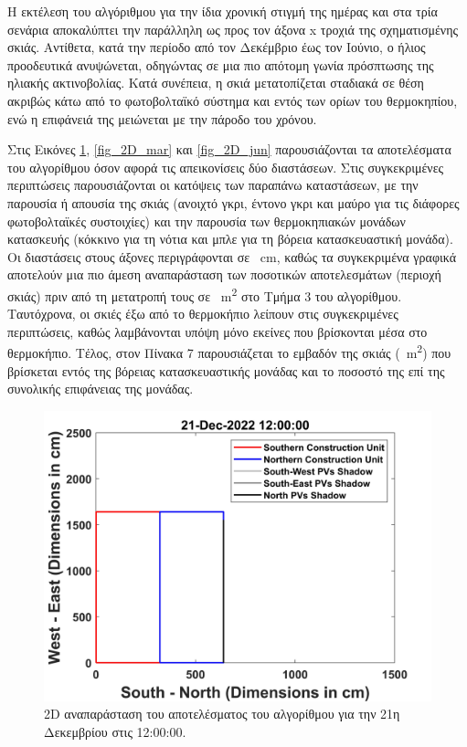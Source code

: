 \documentclass[12pt, a4paper]{report} %
\newcommand{\english}{\foreignlanguage{english}}
\begin{document}
Η εκτέλεση του αλγόριθμου για την ίδια χρονική στιγμή της ημέρας και στα τρία σενάρια αποκαλύπτει την παράλληλη ως προς 
τον άξονα \english{x} τροχιά της σχηματισμένης σκιάς. Αντίθετα, κατά την περίοδο από τον Δεκέμβριο έως τον Ιούνιο, ο ήλιος 
προοδευτικά ανυψώνεται, οδηγώντας σε μια πιο απότομη γωνία πρόσπτωσης της ηλιακής ακτινοβολίας. Κατά συνέπεια, η σκιά 
μετατοπίζεται σταδιακά σε θέση ακριβώς κάτω από το φωτοβολταϊκό σύστημα και εντός των ορίων του θερμοκηπίου, ενώ η 
επιφάνειά της μειώνεται με την πάροδο του χρόνου.

Στις Εικόνες \ref{fig_2D_dec}, \ref{fig_2D_mar} και \ref{fig_2D_jun} παρουσιάζονται τα αποτελέσματα του αλγορίθμου όσον 
αφορά τις απεικονίσεις δύο διαστάσεων. Στις συγκεκριμένες περιπτώσεις παρουσιάζονται οι κατόψεις των παραπάνω καταστάσεων, 
με την παρουσία ή απουσία της σκιάς (ανοιχτό γκρι, έντονο γκρι και μαύρο για τις διάφορες φωτοβολταϊκές συστοιχίες) και την 
παρουσία των θερμοκηπιακών μονάδων κατασκευής (κόκκινο για τη νότια και μπλε για τη βόρεια κατασκευαστική μονάδα). Οι 
διαστάσεις στους άξονες περιγράφονται σε \SI{}{\centi\meter}, καθώς τα συγκεκριμένα γραφικά αποτελούν μια πιο άμεση 
αναπαράσταση των ποσοτικών αποτελεσμάτων (περιοχή σκιάς) πριν από τη μετατροπή τους σε \SI{}{\meter\squared} στο Τμήμα 3 
του αλγορίθμου. Ταυτόχρονα, οι σκιές έξω από το θερμοκήπιο λείπουν στις συγκεκριμένες περιπτώσεις, καθώς λαμβάνονται υπόψη 
μόνο εκείνες που βρίσκονται μέσα στο θερμοκήπιο. Τέλος, στον Πίνακα 7 παρουσιάζεται το εμβαδόν της σκιάς (\SI{}{\meter\squared}) 
που βρίσκεται εντός της βόρειας κατασκευαστικής μονάδας και το ποσοστό της επί της συνολικής επιφάνειας της μονάδας.

\begin{figure}[h]%
    \centering
    \includegraphics[scale = 0.073]{Figures/2D_dec.jpg}
    \caption{\english{2D} αναπαράσταση του αποτελέσματος του αλγορίθμου για την 21η Δεκεμβρίου στις 12:00:00.}
    \label{fig_2D_dec}
\end{figure}
\end{document}
